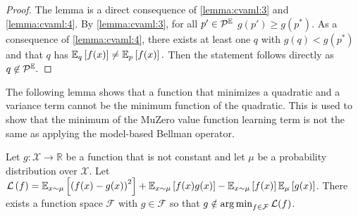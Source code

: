 \begin{proof}
    The lemma is a direct consequence of \autoref{lemma:cvaml:3} and \autoref{lemma:cvaml:4}. 
    By \autoref{lemma:cvaml:3}, for all $p' \in \P^\mathbb{E}$ $g(p') \geq g(p^*)$. As a consequence of \autoref{lemma:cvaml:4}, there exists at least one $q$ with $g(q) < g(p^*)$ and that $q$ has $\EEX{q}{f(x)} \neq \EEX{p}{f(x)}.$ Then the statement follows directly as $q \not \in \P^\mathbb{E}.$
\end{proof}


The following lemma shows that a function that minimizes a quadratic and a variance term cannot be the minimum function of the quadratic. This is used to show that the minimum of the MuZero value function learning term is not the same as applying the model-based Bellman operator.

\begin{lemma}
\label{lemma:cvaml:muzero}
Let $g: \mathcal{X} \rightarrow \mathbb{R}$ be a function that is not constant and let $\mu$ be a probability distribution over $\mathcal{X}$. 
Let $\mathcal{L}\roundb{f} = \mathbb{E}_{x\sim\mu}\squareb{\roundb{f(x) - g(x)}^2} + \mathbb{E}_{x\sim\mu}\squareb{f(x) g(x)} - \mathbb{E}_{x\sim\mu}\squareb{f(x)}\mathbb{E}_\mu\squareb{g(x)}$.
There exists a function space $\mathcal{F}$ with $g \in \mathcal{F}$ so that $g \notin \argmin_{f \in \mathcal{F}} \mathcal{L}(f)$.
\end{lemma}

